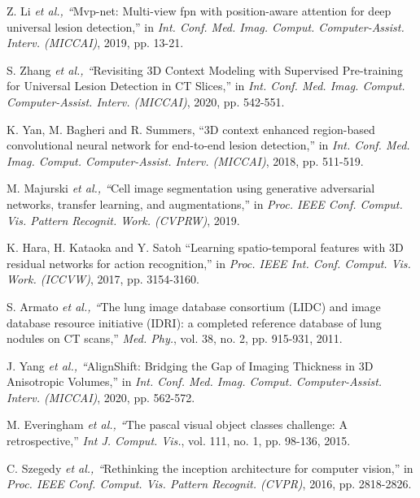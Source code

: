 \documentclass[journal,twoside,web]{ieeecolor}
\begin{document}
\begin{thebibliography}{00}
 Z. Li \emph{et al., ``}Mvp-net: Multi-view fpn with position-aware attention for deep universal lesion detection,'' in \emph{Int. Conf. Med. Imag. Comput. Computer-Assist. Interv. (MICCAI)}, 2019, pp. 13-21.


 S. Zhang \emph{et al., ``}Revisiting 3D Context Modeling with Supervised Pre-training for Universal Lesion Detection in CT Slices,'' in \emph{Int. Conf. Med. Imag. Comput. Computer-Assist. Interv. (MICCAI)}, 2020, pp. 542-551.


 K. Yan, M. Bagheri and R. Summers, ``3D context enhanced region-based convolutional neural network for end-to-end lesion detection,'' in \emph{Int. Conf. Med. Imag. Comput. Computer-Assist. Interv. (MICCAI)}, 2018, pp. 511-519.

 M. Majurski \emph{et al., ``}Cell image segmentation using generative adversarial networks, transfer learning, and augmentations,'' in \emph{Proc. IEEE Conf. Comput. Vis. Pattern Recognit. Work. (CVPRW)}, 2019.





 K. Hara, H. Kataoka and Y. Satoh ``Learning spatio-temporal features with 3D residual networks for action recognition,'' in \emph{Proc. IEEE Int. Conf. Comput. Vis. Work. (ICCVW)}, 2017, pp. 3154-3160.

 S. Armato \emph{et al., ``}The lung image database consortium (LIDC) and image database resource initiative (IDRI): a completed reference database of lung nodules on CT scans,'' \emph{Med. Phy.}, vol. 38, no. 2, pp. 915-931, 2011.



 J. Yang \emph{et al., ``}AlignShift: Bridging the Gap of Imaging Thickness in 3D Anisotropic Volumes,'' in \emph{Int. Conf. Med. Imag. Comput. Computer-Assist. Interv. (MICCAI)}, 2020, pp. 562-572.








 M. Everingham \emph{et al., ``}The pascal visual object classes challenge: A retrospective,'' \emph{Int J. Comput. Vis.}, vol. 111, no. 1, pp. 98-136, 2015. 





 C. Szegedy \emph{et al., ``}Rethinking the inception architecture for computer vision,'' in \emph{Proc. IEEE Conf. Comput. Vis. Pattern Recognit. (CVPR)}, 2016, pp. 2818-2826.














\end{thebibliography}
\end{document}
